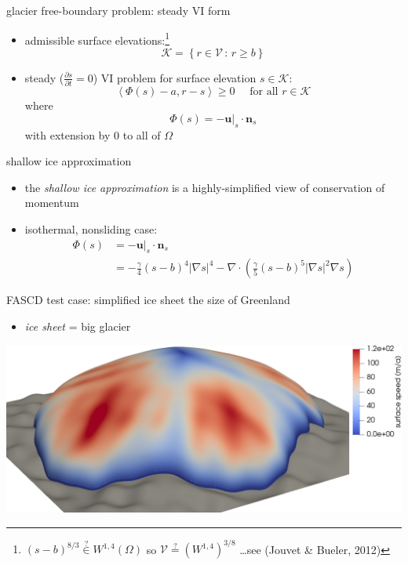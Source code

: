 \documentclass[svgnames,
               hyperref={colorlinks,citecolor=DeepPink4,linkcolor=FireBrick,urlcolor=Maroon},
               usepdftitle=false]  %
               {beamer}
\newcommand{\RR}{\mathbb{R}}
\newcommand{\grad}{\nabla}
\newcommand{\bn}{\mathbf{n}}
\newcommand{\bu}{\mathbf{u}}
\newcommand{\ip}[2]{\left<#1,#2\right>}
\begin{document}
\begin{frame}{glacier free-boundary problem: steady VI form}

\begin{itemize}
\item admissible surface elevations:\footnote{$(s-b)^{8/3} \stackrel{?}{\in} W^{1,4}(\Omega)$ so $\mathcal{V} \stackrel{?}{=} (W^{1,4})^{3/8}$ \dots  see (Jouvet \& Bueler, 2012)}
    $$\mathcal{K} = \left\{r \in \mathcal{V} \,:\, r \ge b\right\}$$
\item steady ($\frac{\partial s}{\partial t}=0$) VI problem for surface elevation $s\in\mathcal{K}$:
	$$\ip{\Phi(s) - a}{r-s} \ge 0 \quad \text{ for all } r \in \mathcal{K}$$
where
    $$\Phi(s)=- \bu|_s \cdot \bn_s$$
with extension by 0 to all of $\Omega$
\end{itemize}
\end{frame}


\begin{frame}{shallow ice approximation}

\begin{itemize}
\item the \emph{shallow ice approximation} is a highly-simplified view of conservation of momentum
\item isothermal, nonsliding case:
\begin{align*}
\Phi(s) &= - \bu|_s \cdot \bn_s \\
        &= - \frac{\gamma}{4} (s-b)^{4} |\grad s|^{4} - \grad \cdot\left(\frac{\gamma}{5} (s-b)^{5} |\grad s|^{2} \grad s\right)
\end{align*}
\end{itemize}
\end{frame}


\begin{frame}{FASCD test case: simplified ice sheet the size of Greenland}

\begin{itemize}
\item \emph{ice sheet} = big glacier
\end{itemize}

\bigskip\bigskip
\centering
\includegraphics[width=\textwidth]{../paper/fixfigs/sialev8scene.png}
\end{frame}
\end{document}
